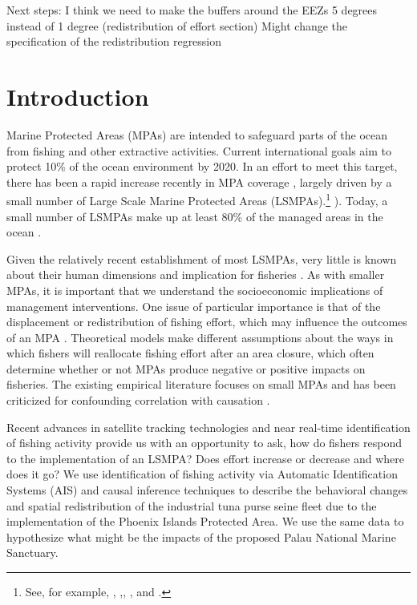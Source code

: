 \documentclass[11pt,english]{article}
\begin{document}
\clearpage

Next steps: I think we need to make the buffers around the EEZs 5 degrees instead of 1 degree (redistribution of effort section)
Might change the specification of the redistribution regression


\section{Introduction}\label{introduction}



Marine Protected Areas (MPAs) are intended to safeguard parts of the
ocean from fishing and other extractive activities. Current
international goals aim to protect 10\% of the ocean environment by
2020. In an effort to meet this target, there has been a rapid
increase recently in MPA coverage \citep{wood_2008,sala_2018}, largely driven by
a small number of Large Scale Marine Protected Areas (LSMPAs).\footnote{See, for example, \citet{game_2009},  \citet{singleton_2014},\citet{boonzaier_2016}, \citet{mccauley_2016}, and \citet{alger_2017}.}
). Today, a small number of LSMPAs make up at least 80\%
of the managed areas in the ocean \citep{toonen_2013}.

Given the relatively recent establishment of most LSMPAs, very little is
known about their human dimensions and implication for fisheries
\citep{gray_2017}. As with smaller MPAs, it is important that we
understand the socioeconomic implications of management interventions.
One issue of particular importance is that of the displacement or
redistribution of fishing effort, which may influence the outcomes of an
MPA \citep{smith_2003}. Theoretical models make different assumptions
about the ways in which fishers will reallocate fishing effort after an
area closure, which often determine whether or not MPAs produce negative or positive impacts on fisheries. The existing empirical literature focuses on small MPAs and has been criticized for confounding correlation with causation \citep{ferraro2018causal}.

Recent advances in satellite tracking technologies and near real-time
identification of fishing activity provide us with an opportunity to ask, how do fishers respond to the implementation of an LSMPA? Does effort increase or decrease and where does it go? We use identification of fishing activity via Automatic
Identification Systems (AIS) and causal inference techniques to describe
the behavioral changes and spatial redistribution of the industrial tuna
purse seine fleet due to the implementation of the Phoenix Islands Protected Area. We use the same data to hypothesize what might be the impacts of the proposed Palau National Marine Sanctuary.
\end{document}
